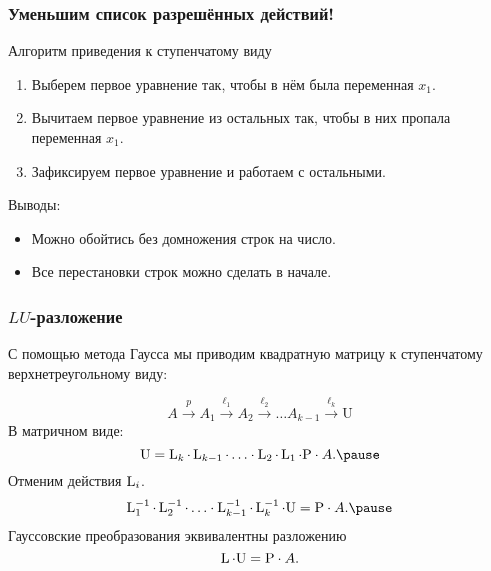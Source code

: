 \begin{frame}
    \frametitle{Уменьшим список разрешённых действий!}

    \begin{block}{Алгоритм приведения к ступенчатому виду}
    \begin{enumerate}
        \item Выберем первое уравнение так, чтобы в нём была переменная $x_1$.
        \item Вычитаем первое уравнение из остальных так, чтобы в них пропала переменная $x_1$.
        \item Зафиксируем первое уравнение и работаем с остальными. 
    \end{enumerate}
    \end{block}
    \pause
    Выводы:
    \begin{itemize}
        \item Можно обойтись без домножения строк на число. \pause
        \item Все перестановки строк можно сделать в начале. 
\end{itemize}

    

\end{frame}


\begin{frame}
    \frametitle{$LU$-разложение}

    С помощью метода Гаусса мы приводим квадратную матрицу к ступенчатому верхнетреугольному виду:

    \[
    A \overset{p}{\to} A_1  \overset{\ell_1}{\to} A_2 \overset{\ell_2}{\to} \ldots A_{k-1}\overset{\ell_k}{\to} \mathrm{U} 
    \]
    \pause
    В матричном виде: 
    \[
    \mathrm{U} = \LL_k \cdot \LL_{k-1} \cdot \ldots  \cdot  \LL_2 \cdot \LL_{1} \cdot \mathrm{P} \cdot A.\pause
    \]
    Отменим действия $\operatorname{L}_i$.
    \[
        \LL_1^{-1} \cdot \LL_2^{-1} \cdot \ldots \cdot \LL_{k-1}^{-1} \cdot  \LL_k^{-1} \cdot \mathrm{U} =  \mathrm{P} \cdot A.\pause
    \]
    Гауссовские преобразования эквивалентны разложению
    \[
    \operatorname{L}\cdot  \mathrm{U} = \mathrm{P} \cdot A.     
    \]

\end{frame}

